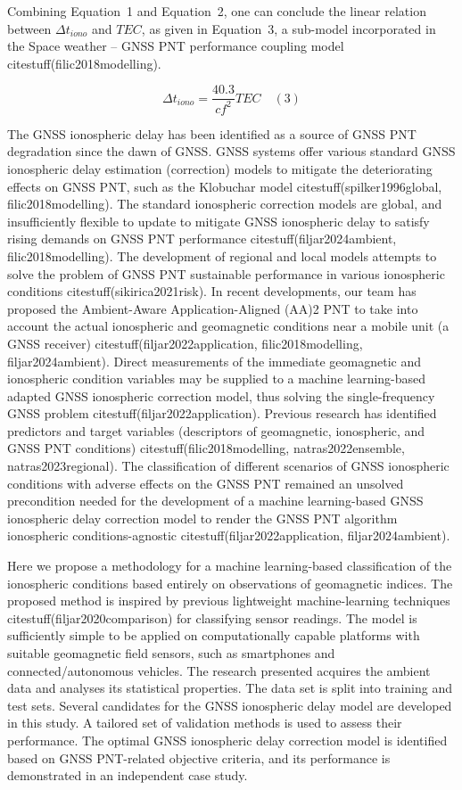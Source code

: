 \documentclass[preprint,12pt]{elsarticle}
\begin{document}
Combining Equation~1 and Equation~2, one can conclude the linear relation between $\Delta t_{iono}$ and $TEC$, as given in Equation~3, a sub-model incorporated in the Space weather – GNSS PNT performance coupling model citestuff(filic2018modelling).

\begin{equation}
	\Delta t_{iono} = \frac{40.3}{c f^{2}} TEC
	\quad\left(3\right)
\end{equation}

The GNSS ionospheric delay has been identified as a source of GNSS PNT degradation since the dawn of GNSS. GNSS systems offer various standard GNSS ionospheric delay estimation (correction) models to mitigate the deteriorating effects on GNSS PNT, such as the Klobuchar model citestuff(spilker1996global, filic2018modelling). The standard ionospheric correction models are global, and insufficiently flexible to update to mitigate GNSS ionospheric delay to satisfy rising demands on GNSS PNT performance citestuff(filjar2024ambient, filic2018modelling). The development of regional and local models attempts to solve the problem of GNSS PNT sustainable performance in various ionospheric conditions citestuff(sikirica2021risk). In recent developments, our team has proposed the Ambient-Aware Application-Aligned (AA)2 PNT to take into account the actual ionospheric and geomagnetic conditions near a mobile unit (a GNSS receiver) citestuff(filjar2022application, filic2018modelling, filjar2024ambient). Direct measurements of the immediate geomagnetic and ionospheric condition variables may be supplied to a machine learning-based adapted GNSS ionospheric correction model, thus solving the single-frequency GNSS problem citestuff(filjar2022application). Previous research has identified predictors and target variables (descriptors of geomagnetic, ionospheric, and GNSS PNT conditions) citestuff(filic2018modelling, natras2022ensemble, natras2023regional). The classification of different scenarios of GNSS ionospheric conditions with adverse effects on the GNSS PNT remained an unsolved precondition needed for the development of a machine learning-based GNSS ionospheric delay correction model to render the GNSS PNT algorithm ionospheric conditions-agnostic citestuff(filjar2022application, filjar2024ambient).

Here we propose a methodology for a machine learning-based classification of the ionospheric conditions based entirely on observations of geomagnetic indices. The proposed method is inspired by previous lightweight machine-learning techniques citestuff(filjar2020comparison) for classifying sensor readings. The model is sufficiently simple to be applied on computationally capable platforms with suitable geomagnetic field sensors, such as smartphones and connected/autonomous vehicles. The research presented acquires the ambient data and analyses its statistical properties. The data set is split into training and test sets. Several candidates for the GNSS ionospheric delay model are developed in this study. A tailored set of validation methods is used to assess their performance. The optimal GNSS ionospheric delay correction model is identified based on GNSS PNT-related objective criteria, and its performance is demonstrated in an independent case study.
\end{document}

